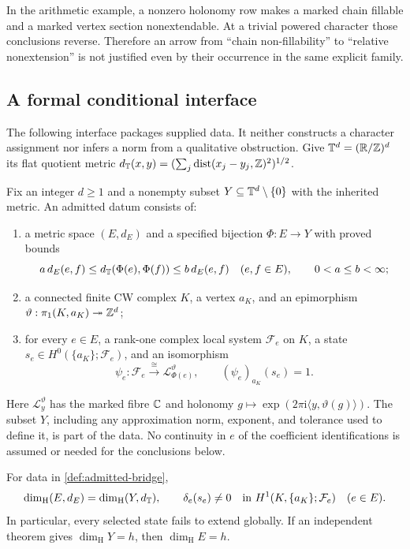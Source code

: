 \documentclass[11pt,a4paper]{article}
\begin{document}
In the arithmetic example, a nonzero holonomy row makes a marked chain
fillable and a marked vertex section nonextendable.  At a trivial powered
character those conclusions reverse.  Therefore an arrow from ``chain
non-fillability'' to ``relative nonextension'' is not justified even by
their occurrence in the same explicit family.

\subsection{A formal conditional interface}

The following interface packages supplied data.  It neither constructs a
character assignment nor infers a norm from a qualitative obstruction.
Give $\mathbb T^d=(\mathbb R/\mathbb Z)^d$ its flat quotient metric
$d_{\mathbb T}(x,y)=(\sum_j\operatorname{dist}(x_j-y_j,\mathbb Z)^2)^{1/2}$.

\begin{definition}
\label{def:admitted-bridge}
Fix an integer $d\geq1$ and a nonempty subset
$Y\subseteq\mathbb T^d\setminus\{0\}$ with the inherited metric.  An admitted
datum consists of:
\begin{enumerate}
 \item a metric space $(E,d_E)$ and a specified bijection $\Phi:E\to Y$
 with proved bounds
 \[
  a\,d_E(e,f)\leq d_{\mathbb T}(\Phi(e),\Phi(f))\leq b\,d_E(e,f)
          \quad(e,f\in E),\qquad 0<a\leq b<\infty;
 \]
 \item a connected finite CW complex $K$, a vertex $a_K$, and an
 epimorphism $\vartheta:\pi_1(K,a_K)\twoheadrightarrow\mathbb Z^d$;
 \item for every $e\in E$, a rank-one complex local system $\mathcal F_e$
 on $K$, a state $s_e\in H^0(\{a_K\};\mathcal F_e)$, and an isomorphism
 \[
  \psi_e:\mathcal F_e\xrightarrow{\ \cong\ }
                  \mathcal L_{\Phi(e)}^\vartheta,
  \qquad (\psi_e)_{a_K}(s_e)=1.
 \]
\end{enumerate}
Here $\mathcal L_y^\vartheta$ has the marked fibre $\mathbb C$ and holonomy
$g\mapsto\exp(2\pi\mathrm i\langle y,\vartheta(g)\rangle)$.
The subset $Y$, including any approximation norm, exponent, and tolerance
used to define it, is part of the data.  No continuity in $e$ of the
coefficient identifications is assumed or needed for the conclusions below.
\end{definition}

\begin{proposition}
\label{prop:admitted-bridge}
For data in \cref{def:admitted-bridge},
\[
 \dim_{\mathrm H}(E,d_E)=\dim_{\mathrm H}(Y,d_{\mathbb T}),\qquad
 \delta_e(s_e)\ne0\quad\text{in }H^1(K,\{a_K\};\mathcal F_e)
                         \quad(e\in E).
\]
In particular, every selected state fails to extend globally.  If an
independent theorem gives $\dim_{\mathrm H}Y=h$, then
$\dim_{\mathrm H}E=h$.
\end{proposition}
\end{document}
